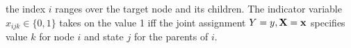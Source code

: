\documentclass{article}
\begin{document}
the index $i$ ranges over the target node and its children. The indicator variable $x_{ijk} \in \{0,1\}$ takes on the value 1 iff the joint assignment $Y = y,\mathbf{X}=\mathbf{x}$ specifies value $k$ for node $i$ and state $j$ for the parents of $i$.
%
%
\end{document}
